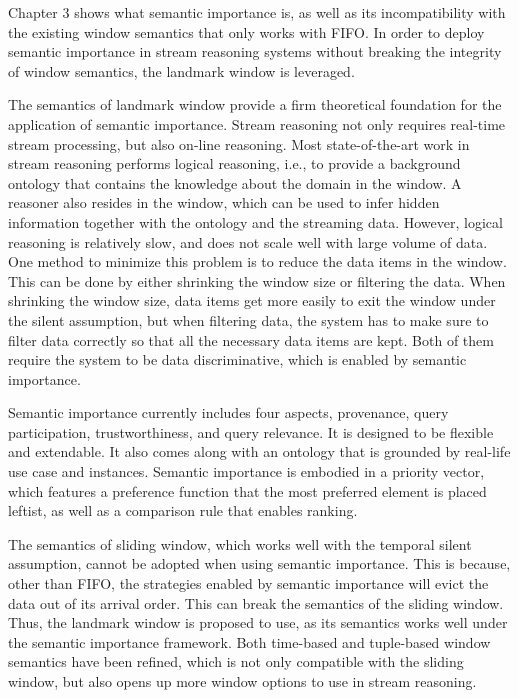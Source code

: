 Chapter 3 shows what semantic importance is, as well as its incompatibility with the existing window semantics that only works with FIFO.
In order to deploy semantic importance in stream reasoning systems without breaking the integrity of window semantics, the landmark window is leveraged.

The semantics of landmark window provide a firm theoretical foundation for the application of semantic importance. 
Stream reasoning not only requires real-time stream processing, but also on-line reasoning.
Most state-of-the-art work in stream reasoning performs logical reasoning, i.e., to provide a background ontology that contains the knowledge about the domain in the window.
A reasoner also resides in the window, which can be used to infer hidden information together with the ontology and the streaming data. 
However, logical reasoning is relatively slow, and does not scale well with large volume of data. 
One method to minimize this problem is to reduce the data items in the window. 
This can be done by either shrinking the window size or filtering the data. 
When shrinking the window size, data items get more easily to exit the window under the silent assumption, but when filtering data, the system has to make sure to filter data correctly so that all the necessary data items are kept. 
Both of them require the system to be data discriminative, which is enabled by semantic importance. 

Semantic importance currently includes four aspects, provenance, query participation, trustworthiness, and query relevance. 
It is designed to be flexible and extendable. 
It also comes along with an ontology that is grounded by real-life use case and instances.
Semantic importance is embodied in a priority vector, which features a preference function that the most preferred element is placed leftist, as well as a comparison rule that enables ranking.

The semantics of sliding window, which works well with the temporal silent assumption, cannot be adopted when using semantic importance. 
This is because, other than FIFO, the strategies enabled by semantic importance will evict the data out of its arrival order.
This can break the semantics of the sliding window.
Thus, the landmark window is proposed to use, as its semantics works well under the semantic importance framework. 
Both time-based and tuple-based window semantics have been refined, which is not only compatible with the sliding window, but also opens up more window options to use in stream reasoning. 

